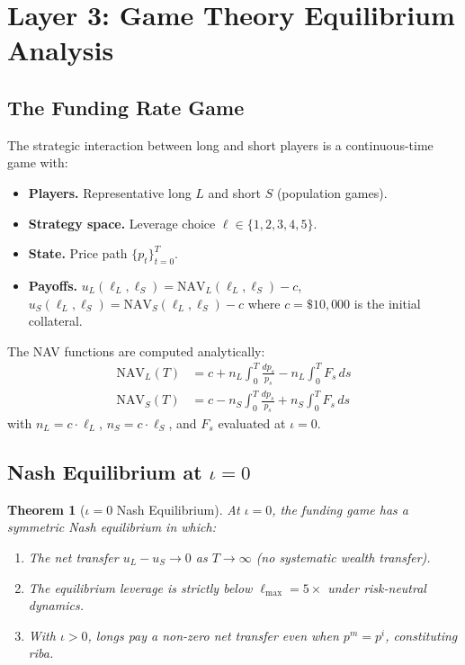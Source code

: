 \documentclass[10pt,twocolumn]{article}
\theoremstyle{plain}
\newtheorem{theorem}{Theorem}
\theoremstyle{definition}
\begin{document}
\section{Layer 3: Game Theory Equilibrium Analysis}
\label{sec:gt}

\subsection{The Funding Rate Game}

The strategic interaction between long and short players
is a continuous-time game with:

\begin{itemize}[leftmargin=*,noitemsep]
\item \textbf{Players.}  Representative long $L$ and
  short $S$ (population games).
\item \textbf{Strategy space.}  Leverage choice
  $\ell \in \{1,2,3,4,5\}$.
\item \textbf{State.}  Price path $\{p_t\}_{t=0}^T$.
\item \textbf{Payoffs.}
  $u_L(\ell_L, \ell_S) = \mathrm{NAV}_L(\ell_L, \ell_S) - c$,
  $u_S(\ell_L, \ell_S) = \mathrm{NAV}_S(\ell_L, \ell_S) - c$
  where $c = \$10{,}000$ is the initial collateral.
\end{itemize}

The NAV functions are computed analytically:
\begin{align}
  \mathrm{NAV}_L(T) &= c + n_L\!\int_0^T\!\frac{dp_s}{p_s}
    - n_L\!\int_0^T\! F_s\,ds \\
  \mathrm{NAV}_S(T) &= c - n_S\!\int_0^T\!\frac{dp_s}{p_s}
    + n_S\!\int_0^T\! F_s\,ds
\end{align}
with $n_L = c\cdot\ell_L$, $n_S = c\cdot\ell_S$,
and $F_s$ evaluated at $\iota=0$.

\subsection{Nash Equilibrium at $\iota=0$}

\begin{theorem}[$\iota=0$ Nash Equilibrium]
\label{thm:nash}
At $\iota=0$, the funding game has a symmetric Nash
equilibrium in which:
\begin{enumerate}[leftmargin=*,noitemsep]
\item The net transfer $u_L - u_S \to 0$ as
  $T \to \infty$ (no systematic wealth transfer).
\item The equilibrium leverage is strictly below
  $\ell_{\max} = 5\times$ under risk-neutral dynamics.
\item With $\iota > 0$, longs pay a non-zero net
  transfer even when $p^m = p^i$, constituting riba.
\end{enumerate}
\end{theorem}
\end{document}
